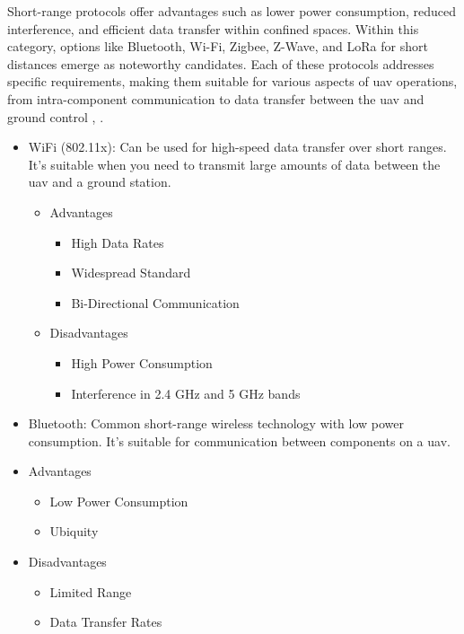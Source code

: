 Short-range protocols offer advantages such as lower power consumption, reduced interference, and efficient data transfer within confined spaces.
Within this category, options like Bluetooth, Wi-Fi, Zigbee, Z-Wave, and LoRa for short distances emerge as noteworthy candidates.
Each of these protocols addresses specific requirements, making them suitable for various aspects of \gls{uav} operations, from intra-component communication to data transfer between the \gls{uav} and ground control \cite{WCOM6}, \cite{WCOM7}.

\begin{itemize}
    \item WiFi (802.11x): Can be used for high-speed data transfer over short ranges. It's suitable when you need to transmit large amounts of data between the \gls{uav} and a ground station.
          \begin{itemize}
              \item Advantages
                    \begin{itemize}
                        \item High Data Rates
                        \item Widespread Standard
                        \item Bi-Directional Communication
                    \end{itemize}
              \item Disadvantages
                    \begin{itemize}
                        \item High Power Consumption
                        \item Interference in 2.4 GHz and 5 GHz bands
                    \end{itemize}
          \end{itemize}

    \item Bluetooth: Common short-range wireless technology with low power consumption. It's suitable for communication between components on a \gls{uav}.
    \item Advantages
          \begin{itemize}
              \item Low Power Consumption
              \item Ubiquity
          \end{itemize}
    \item Disadvantages
          \begin{itemize}
              \item Limited Range
              \item Data Transfer Rates
          \end{itemize}


\end{itemize}
